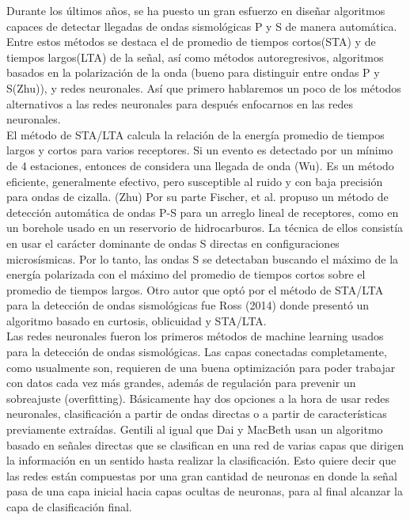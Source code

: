 \documentclass[../main.tex]{subfiles}
\begin{document}
Durante los últimos años, se ha puesto un gran esfuerzo en diseñar algoritmos capaces de detectar llegadas de ondas sismológicas P y S de manera automática. Entre estos métodos se destaca el de promedio de tiempos cortos(STA) y de tiempos largos(LTA) de la señal, así como métodos autoregresivos, algoritmos basados en la polarización de la onda (bueno para distinguir entre ondas P y S(Zhu)), y redes neuronales. Así que primero hablaremos un poco de los métodos alternativos a las redes neuronales para después enfocarnos en las redes neuronales.\\

El método de STA/LTA calcula la relación de la energía promedio de tiempos largos y cortos para varios receptores. Si un evento es detectado por un mínimo de 4 estaciones, entonces de considera una llegada de onda (Wu). Es un método eficiente, generalmente efectivo, pero susceptible al ruido y con baja precisión para ondas de cizalla. (Zhu) Por su parte Fischer, et al. propuso un método de detección automática de ondas P-S para un arreglo lineal de receptores, como en un borehole usado en un reservorio de hidrocarburos. La técnica de ellos consistía en usar el carácter dominante de ondas S directas en configuraciones microsísmicas. Por lo tanto, las ondas S se detectaban buscando el máximo de la energía polarizada con el máximo del promedio de tiempos cortos sobre el promedio de tiempos largos. Otro autor que optó por el método de STA/LTA para la detección de ondas sismológicas fue Ross (2014) donde presentó un algoritmo basado en curtosis, oblicuidad y STA/LTA.\\


Las redes neuronales fueron los primeros métodos de machine learning usados para la detección de ondas sismológicas. Las capas conectadas completamente, como usualmente son, requieren de una buena optimización para poder trabajar con datos cada vez más grandes, además de regulación para prevenir un sobreajuste (overfitting). Básicamente hay dos opciones a la hora de usar redes neuronales, clasificación a partir de ondas directas o a partir de características previamente extraídas. Gentili al igual que Dai y MacBeth usan un algoritmo basado en señales directas que se clasifican en una red de varias capas que dirigen la información en un sentido hasta realizar la clasificación. Esto quiere decir que las redes están compuestas por una gran cantidad de neuronas en donde la señal pasa de una capa inicial hacia capas ocultas de neuronas, para al final alcanzar la capa de clasificación final.\\ 
\end{document}
